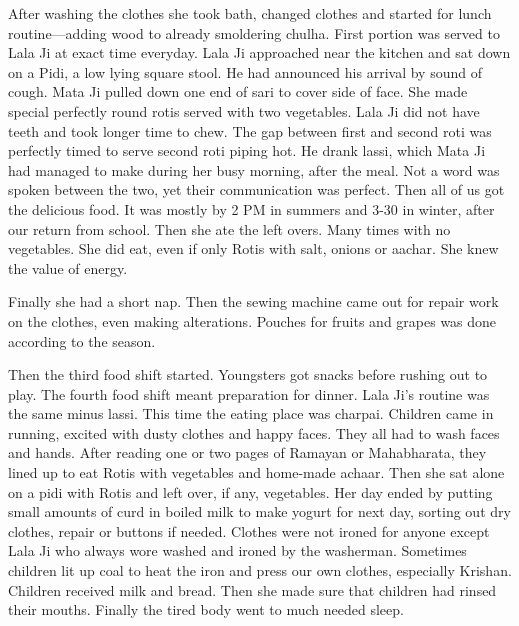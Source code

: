 After washing the clothes she took bath, changed clothes and started for lunch routine—adding wood to already smoldering chulha. First portion was served to Lala Ji at exact time everyday. 
Lala Ji approached near the kitchen and sat down on a Pidi, a low lying square stool. He had announced his arrival by sound of cough. Mata Ji pulled down one end of sari to cover side of face. She made special perfectly round rotis served with two vegetables. Lala Ji did not have teeth and took longer time to chew. The gap between first and second roti was perfectly timed to serve second roti piping hot. He drank lassi, which Mata Ji had managed to make during her busy morning, after the meal. 
Not a word was spoken between the two, yet their communication was perfect. 
Then all of us got the delicious food. It was mostly by 2 PM in summers and 3-30 in winter, after our return from school. Then she ate the left overs. Many times with no vegetables. She did eat, even if only Rotis with salt, onions or aachar. She knew the value of energy. 

Finally she had a short nap. Then the sewing machine came out for repair work on the clothes, even making alterations. Pouches for fruits and grapes was done according to the season. 

Then the third food shift started. Youngsters got snacks before rushing out to play. The fourth food shift meant preparation for dinner. Lala Ji’s routine was the same minus lassi. This time the eating place was charpai. Children came in running, excited with dusty clothes and happy faces. They all had to wash faces and hands. After reading one or two pages of Ramayan or Mahabharata, they lined up to eat Rotis with vegetables and home-made achaar. Then she sat alone on a pidi with Rotis and left over, if any, vegetables. 
Her day ended by putting small amounts of curd in boiled milk to make yogurt for next day, sorting out dry clothes, repair or buttons if needed. Clothes were not ironed for anyone except Lala Ji who always wore washed and ironed by the washerman. Sometimes children lit up coal to heat the iron and press our own clothes, especially Krishan. 
Children received milk and bread. Then she made sure that children had rinsed their mouths. 
Finally the tired body went to much needed sleep. 

